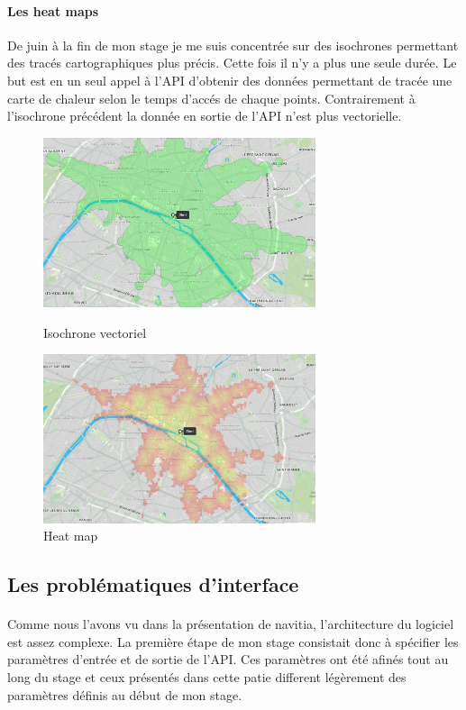 \documentclass[a4paper]{report}
\begin{document}
\paragraph{Les  heat maps} De juin à la fin de mon stage je me suis concentrée sur des isochrones permettant des tracés cartographiques plus précis. Cette fois il n'y a plus une seule durée. Le but est en un seul appel à l'API d'obtenir des données permettant de tracée une carte de chaleur selon le temps d'accés de chaque points. Contrairement à l'isochrone précédent la donnée en sortie de l'API n'est plus vectorielle.

\begin{figure}[H]
	\begin{minipage}[c]{.46\linewidth}
		\includegraphics[width=8cm]{image/iso_vect}
       		\caption{Isochrone vectoriel}
		\label{Isochrone vectoriel}
	\end{minipage} \hfill
	\begin{minipage}[c]{.46\linewidth}
		\includegraphics[width=8cm]{image/heat_map}
       		\caption{Heat map}
		\label{Heat map}
	\end{minipage}
\end{figure}

\subsection{Les problématiques d'interface}

\paragraph{} Comme nous l'avons vu dans la présentation de navitia, l'architecture du logiciel est assez complexe. La première étape de mon stage consistait donc à spécifier les paramètres d'entrée et de sortie de l'API. Ces paramètres ont été afinés tout au long du stage et ceux présentés dans cette patie different légèrement des paramètres définis au début de mon stage. 
\end{document}
